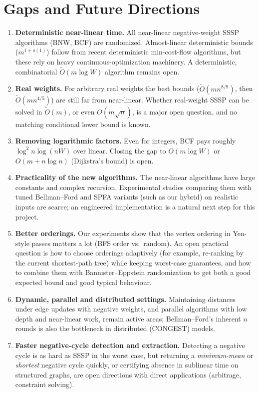 \documentclass[11pt,a4paper]{article}
\theoremstyle{definition}
\newcommand{\Ot}{\tilde{O}}
\begin{document}
\section{Gaps and Future Directions}

\begin{enumerate}
\item \textbf{Deterministic near-linear time.} All near-linear negative-weight SSSP algorithms (BNW, BCF) are randomized. Almost-linear deterministic bounds ($m^{1+o(1)}$) follow from recent deterministic min-cost-flow algorithms, but these rely on heavy continuous-optimization machinery. A deterministic, combinatorial $\Ot(m\log W)$ algorithm remains open.
\item \textbf{Real weights.} For arbitrary real weights the best bounds ($\Ot(mn^{8/9})$, then $\Ot(mn^{4/5})$) are still far from near-linear. Whether real-weight SSSP can be solved in $\Ot(m)$, or even $O(m\sqrt n)$, is a major open question, and no matching conditional lower bound is known.
\item \textbf{Removing logarithmic factors.} Even for integers, BCF pays roughly $\log^2 n\log(nW)$ over linear. Closing the gap to $O(m\log W)$ or $O(m+n\log n)$ (Dijkstra's bound) is open.
\item \textbf{Practicality of the new algorithms.} The near-linear algorithms have large constants and complex recursion. Experimental studies comparing them with tuned Bellman--Ford and SPFA variants (such as our hybrid) on realistic inputs are scarce; an engineered implementation is a natural next step for this project.
\item \textbf{Better orderings.} Our experiments show that the vertex ordering in Yen-style passes matters a lot (BFS order vs.\ random). An open practical question is how to choose orderings adaptively (for example, re-ranking by the current shortest-path tree) while keeping worst-case guarantees, and how to combine them with Bannister--Eppstein randomization to get both a good expected bound and good typical behaviour.
\item \textbf{Dynamic, parallel and distributed settings.} Maintaining distances under edge updates with negative weights, and parallel algorithms with low depth and near-linear work, remain active areas; Bellman--Ford's inherent $n$ rounds is also the bottleneck in distributed (CONGEST) models.
\item \textbf{Faster negative-cycle detection and extraction.} Detecting a negative cycle is as hard as SSSP in the worst case, but returning a \emph{minimum-mean} or \emph{shortest} negative cycle quickly, or certifying absence in sublinear time on structured graphs, are open directions with direct applications (arbitrage, constraint solving).
\end{enumerate}
\end{document}
